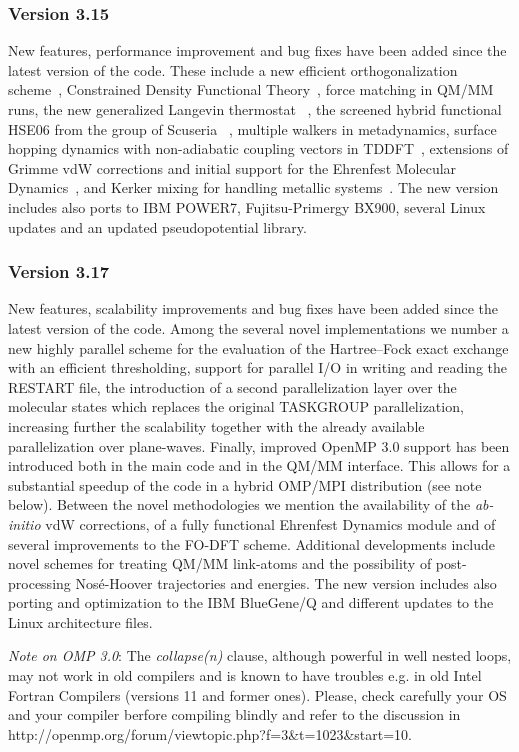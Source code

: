 \documentclass[twoside,10pt,titlepage,a4paper]{article}
\begin{document}
\subsubsection{Version 3.15}
New features, performance improvement and bug fixes have been added
since the latest version of the code. 
These include a new efficient orthogonalization scheme~\cite{be_cur},
Constrained Density Functional Theory~\cite{ober}, force matching in
QM/MM runs, the new generalized Langevin thermostat ~\cite{ceriotti},
the screened hybrid functional HSE06 from the group of 
Scuseria ~\cite{HSE06a,HSE06b}, 
multiple walkers in metadynamics, surface hopping
dynamics with non-adiabatic coupling vectors in TDDFT~\cite{taver},
extensions of Grimme vdW corrections and initial support for the Ehrenfest Molecular
Dynamics~\cite{taver1}, and Kerker mixing for handling metallic 
systems~\cite{Kerker}.  
The new version includes also ports to IBM
POWER7, Fujitsu-Primergy BX900, several Linux updates and an updated
pseudopotential library.

\subsubsection{Version 3.17}
%
New features, scalability improvements and bug fixes have been added since the
latest version of the code.
%
Among the several novel implementations we number a new highly parallel scheme
for the evaluation of the Hartree--Fock exact exchange with an efficient
thresholding, support for parallel I/O in writing and reading the RESTART file,
the introduction of a second parallelization layer over the molecular states
which replaces the original TASKGROUP parallelization, increasing further the
scalability together with the already available parallelization over
plane-waves.
%
Finally, improved OpenMP 3.0 support has been introduced both in the main code
and in the QM/MM interface.  This allows for a substantial speedup of the code
in a hybrid OMP/MPI distribution (see note below).
%
Between the novel methodologies  we mention the availability of the {\it
ab-initio} vdW corrections, of a fully functional Ehrenfest Dynamics module and
of several improvements to the FO-DFT scheme.  Additional developments include
novel schemes for treating  QM/MM link-atoms and the possibility of
post-processing Nos\'e-Hoover trajectories and energies.
%
The new version includes also porting and optimization to the IBM BlueGene/Q
and different updates to the Linux architecture files.


\emph{Note on OMP 3.0}: The {\it collapse(n)} clause, although powerful in well
nested loops, may not work in old compilers and is known to have troubles e.g.
in old Intel Fortran Compilers (versions 11 and former ones). 
%
Please, check carefully your OS and your compiler berfore compiling blindly and
refer to the discussion in
http://openmp.org/forum/viewtopic.php?f=3\&t=1023\&start=10.
\end{document}
